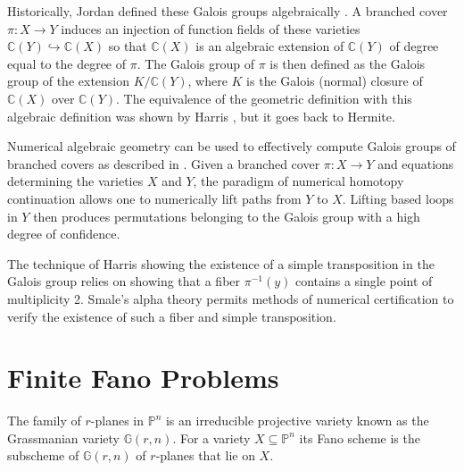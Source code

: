 \documentclass[12pt]{amsart}
\theoremstyle{definition}
\newcommand{\gr}{\mathbb{G}}
\newcommand{\defcolor}[1]{{\color{RoyalBlue}#1}}
\begin{document}
%
Historically, Jordan defined these Galois groups algebraically \cite{Jordan}. A branched cover $\pi:X\to Y$ induces an injection of function fields of these varieties $\mathbb{C}(Y)\hookrightarrow\mathbb{C}(X)$ so that $\mathbb{C}(X)$ is an algebraic extension of $\mathbb{C}(Y)$ of degree equal to the degree of $\pi$. The Galois group of $\pi$ is then defined as the Galois group of the extension $K/\mathbb{C}(Y)$, where $K$ is the Galois (normal) closure of $\mathbb{C}(X)$ over $\mathbb{C}(Y)$. The equivalence of the geometric definition with this algebraic definition was shown by Harris \cite{Harris}, but it goes back to Hermite. 




%
Numerical algebraic geometry can be used to effectively compute Galois groups of branched covers as described in \cite{ngalois}. Given a branched cover $\pi:X\to Y$ and equations determining the varieties $X$ and $Y$, the paradigm of numerical homotopy continuation allows one to numerically lift paths from $Y$ to $X$. Lifting based loops in $Y$ then produces permutations belonging to the Galois group with a high degree of confidence. 

The technique of Harris showing the existence of a simple transposition in the Galois group relies on showing that a fiber $\pi^{-1}(y)$ contains a single point of multiplicity 2. Smale's alpha theory permits methods of numerical certification to verify the existence of such a fiber and simple transposition.



\section{Finite Fano Problems}
%
The family of $r$-planes in $\mathbb{P}^n$ is an irreducible projective variety known as the \defcolor{Grassmanian variety} $\gr(r,n)$. For a variety $X\subseteq\mathbb{P}^n$ its \defcolor{Fano scheme} is the subscheme of $\gr(r,n)$ of $r$-planes that lie on $X$. 
\end{document}

